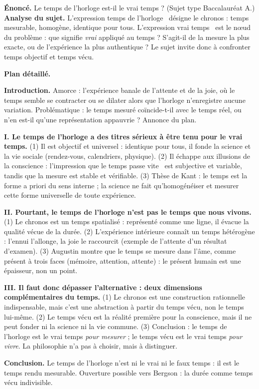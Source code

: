 \documentclass[11pt]{article}
\begin{document}
\begin{exoresolu}
\textbf{Énoncé.} Le temps de l'horloge est-il le vrai temps ? (Sujet type Baccalauréat A.)
\tcblower
\textbf{Analyse du sujet.} L'expression \guillemotleft temps de l'horloge \guillemotright\ désigne le chronos : temps mesurable, homogène, identique pour tous. L'expression \guillemotleft vrai temps \guillemotright\ est le nœud du problème : que signifie \emph{vrai} appliqué au temps ? S'agit-il de la mesure la plus exacte, ou de l'expérience la plus authentique ? Le sujet invite donc à confronter temps objectif et temps vécu.

\textbf{Plan détaillé.}

\textbf{Introduction.} Amorce : l'expérience banale de l'attente et de la joie, où le temps semble se contracter ou se dilater alors que l'horloge n'enregistre aucune variation. Problématique : le temps mesuré coïncide-t-il avec le temps réel, ou n'en est-il qu'une représentation appauvrie ? Annonce du plan.

\textbf{I. Le temps de l'horloge a des titres sérieux à être tenu pour le vrai temps.} (1) Il est objectif et universel : identique pour tous, il fonde la science et la vie sociale (rendez-vous, calendriers, physique). (2) Il échappe aux illusions de la conscience : l'impression que le temps \guillemotleft passe vite \guillemotright\ est subjective et variable, tandis que la mesure est stable et vérifiable. (3) Thèse de Kant : le temps est la forme a priori du sens interne ; la science ne fait qu'homogénéiser et mesurer cette forme universelle de toute expérience.

\textbf{II. Pourtant, le temps de l'horloge n'est pas le temps que nous vivons.} (1) Le chronos est un temps spatialisé : représenté comme une ligne, il évacue la qualité vécue de la durée. (2) L'expérience intérieure connaît un temps hétérogène : l'ennui l'allonge, la joie le raccourcit (exemple de l'attente d'un résultat d'examen). (3) Augustin montre que le temps se mesure dans l'âme, comme présent à trois faces (mémoire, attention, attente) : le présent humain est une épaisseur, non un point.

\textbf{III. Il faut donc dépasser l'alternative : deux dimensions complémentaires du temps.} (1) Le chronos est une construction rationnelle indispensable, mais c'est une abstraction à partir du temps vécu, non le temps lui-même. (2) Le temps vécu est la réalité première pour la conscience, mais il ne peut fonder ni la science ni la vie commune. (3) Conclusion : le temps de l'horloge est le vrai temps \emph{pour mesurer} ; le temps vécu est le vrai temps \emph{pour vivre}. La philosophie n'a pas à choisir, mais à distinguer.

\textbf{Conclusion.} Le temps de l'horloge n'est ni le vrai ni le faux temps : il est le temps rendu mesurable. Ouverture possible vers Bergson : la durée comme temps vécu indivisible.
\end{exoresolu}
\end{document}
